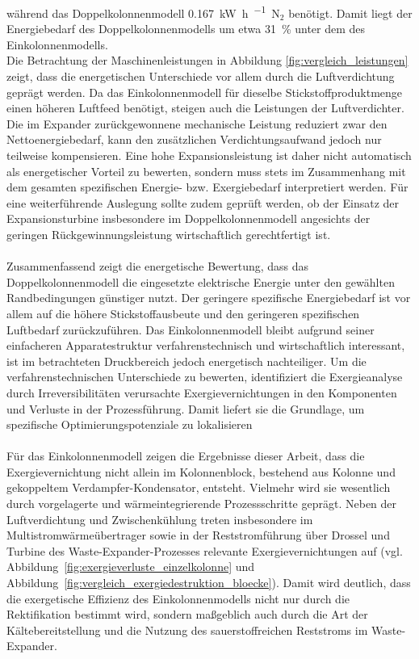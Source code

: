 während das Doppelkolonnenmodell
\SI{0.167}{\kilo\watt\hour\per\normalcubicmetre}~\(\mathrm{N_2}\)
benötigt. Damit liegt der Energiebedarf des Doppelkolonnenmodells um etwa
\SI{31}{\percent} unter dem des Einkolonnenmodells.\\
Die Betrachtung der Maschinenleistungen in Abbildung \ref{fig:vergleich_leistungen} zeigt, dass die energetischen Unterschiede vor allem durch die Luftverdichtung geprägt werden. Da das Einkolonnenmodell für dieselbe Stickstoffproduktmenge einen höheren Luftfeed benötigt, steigen auch die Leistungen der Luftverdichter. Die im Expander zurückgewonnene mechanische Leistung reduziert zwar den Nettoenergiebedarf, kann den zusätzlichen Verdichtungsaufwand jedoch nur teilweise kompensieren. Eine hohe Expansionsleistung ist daher nicht automatisch als energetischer Vorteil zu bewerten, sondern muss stets im Zusammenhang mit dem gesamten spezifischen Energie- bzw. Exergiebedarf interpretiert werden. Für eine weiterführende Auslegung sollte zudem geprüft werden, ob der Einsatz der Expansionsturbine insbesondere im Doppelkolonnenmodell angesichts der geringen Rückgewinnungsleistung wirtschaftlich gerechtfertigt ist.\\
\\
Zusammenfassend zeigt die energetische Bewertung, dass das
Doppelkolonnenmodell die eingesetzte elektrische Energie unter den gewählten
Randbedingungen günstiger nutzt. Der geringere spezifische Energiebedarf ist
vor allem auf die höhere Stickstoffausbeute und den geringeren spezifischen
Luftbedarf zurückzuführen. Das
Einkolonnenmodell bleibt aufgrund seiner einfacheren Apparatestruktur
verfahrenstechnisch und wirtschaftlich interessant, ist im betrachteten Druckbereich jedoch
energetisch nachteiliger. Um die verfahrenstechnischen Unterschiede zu bewerten, identifiziert die Exergieanalyse durch Irreversibilitäten verursachte Exergievernichtungen in den Komponenten und Verluste in der Prozessführung. Damit liefert sie die Grundlage, um spezifische Optimierungspotenziale zu lokalisieren \\
\\
Für das Einkolonnenmodell zeigen die Ergebnisse dieser Arbeit, dass die Exergievernichtung nicht allein im Kolonnenblock, bestehend aus Kolonne und gekoppeltem Verdampfer-Kondensator, entsteht. Vielmehr wird sie wesentlich durch vorgelagerte und wärmeintegrierende Prozessschritte geprägt. Neben der Luftverdichtung und Zwischenkühlung treten insbesondere im Multistromwärmeübertrager sowie in der Reststromführung über Drossel und Turbine des Waste-Expander-Prozesses relevante Exergievernichtungen auf (vgl. Abbildung~\ref{fig:exergieverluste_einzelkolonne} und Abbildung~\ref{fig:vergleich_exergiedestruktion_bloecke}). Damit wird deutlich, dass die exergetische Effizienz des Einkolonnenmodells nicht nur durch die Rektifikation bestimmt wird, sondern maßgeblich auch durch die Art der Kältebereitstellung und die Nutzung des sauerstoffreichen Reststroms im Waste-Expander.\\
